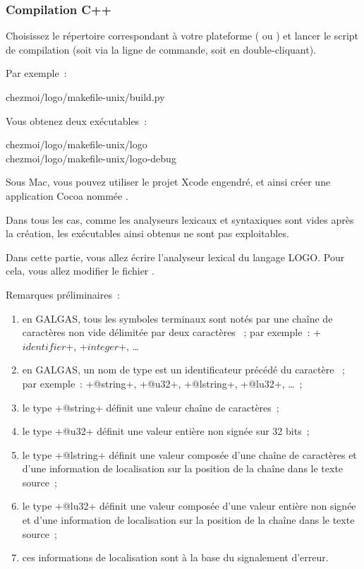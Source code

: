 \subsubsection{Compilation C++}
Choisissez le répertoire correspondant à votre plateforme ( ou ) et lancer le script de compilation  (soit via la ligne de commande, soit en double-cliquant).

Par exemple~:
\begin{SHELL}
chezmoi/logo/makefile-unix/build.py
\end{SHELL}

Vous obtenez deux exécutables~:
\begin{SHELL}
chezmoi/logo/makefile-unix/logo\\
chezmoi/logo/makefile-unix/logo-debug
\end{SHELL}

Sous Mac, vous pouvez utiliser le projet Xcode engendré, et ainsi créer une application Cocoa nommée .

Dans tous les cas, comme les analyseurs lexicaux et syntaxiques sont vides après la création, les exécutables ainsi obtenus ne sont pas exploitables.




Dans cette partie, vous allez écrire l’analyseur lexical du langage LOGO. Pour cela, vous allez modifier le fichier .

Remarques préliminaires~:
\begin{enumerate}
  \item en GALGAS, tous les symboles terminaux sont notés par une chaîne de caractères non vide délimitée par deux caractères \tpp{\$}~; par exemple~: \ggsq+$identifier$+, \ggsq+$integer$+, …
  \item en GALGAS, un nom de type est un identificateur précédé du caractère ~; par exemple~: \ggsq+@string+, \ggsq+@u32+, \ggsq+@lstring+, \ggsq+@lu32+, …~;
  \item le type \ggsq+@string+ définit une valeur chaîne de caractères~;
  \item le type \ggsq+@u32+ définit une valeur entière non signée sur 32 bits~;
  \item le type \ggsq+@lstring+ définit une valeur composée d'une chaîne de caractères et d'une information de localisation sur la position de la chaîne dans le texte source~;
  \item le type \ggsq+@lu32+ définit une valeur composée d'une valeur entière non signée et d'une information de localisation sur la position de la chaîne dans le texte source~;
  \item ces informations de localisation sont à la base du signalement d'erreur.
\end{enumerate}

